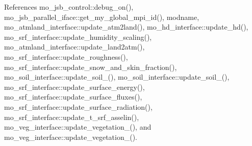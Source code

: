 References mo\+\_\+jsb\+\_\+control\+::debug\+\_\+on(), mo\+\_\+jsb\+\_\+parallel\+\_\+iface\+::get\+\_\+my\+\_\+global\+\_\+mpi\+\_\+id(), modname, mo\+\_\+atmland\+\_\+interface\+::update\+\_\+atm2land(), mo\+\_\+hd\+\_\+interface\+::update\+\_\+hd(), mo\+\_\+srf\+\_\+interface\+::update\+\_\+humidity\+\_\+scaling(), mo\+\_\+atmland\+\_\+interface\+::update\+\_\+land2atm(), mo\+\_\+srf\+\_\+interface\+::update\+\_\+roughness(), mo\+\_\+srf\+\_\+interface\+::update\+\_\+snow\+\_\+and\+\_\+skin\+\_\+fraction(), mo\+\_\+soil\+\_\+interface\+::update\+\_\+soil\+\_(), mo\+\_\+soil\+\_\+interface\+::update\+\_\+soil\+\_(), mo\+\_\+srf\+\_\+interface\+::update\+\_\+surface\+\_\+energy(), mo\+\_\+srf\+\_\+interface\+::update\+\_\+surface\+\_\+fluxes(), mo\+\_\+srf\+\_\+interface\+::update\+\_\+surface\+\_\+radiation(), mo\+\_\+srf\+\_\+interface\+::update\+\_\+t\+\_\+srf\+\_\+asselin(), mo\+\_\+veg\+\_\+interface\+::update\+\_\+vegetation\+\_(), and mo\+\_\+veg\+\_\+interface\+::update\+\_\+vegetation\+\_().


